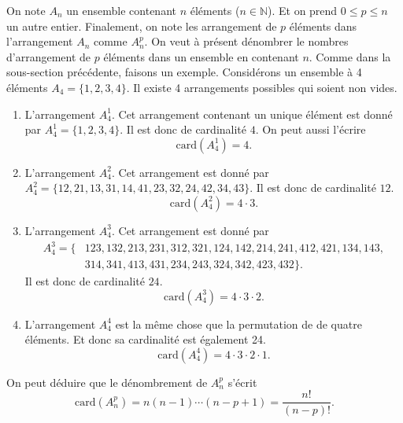 \documentclass[a4paper,12pt]{book}
\renewcommand{\natural}{\mathbb{N}}
\newcommand{\card}{\mathrm{card}}
\begin{document}
On note $A_n$ un ensemble contenant $n$ éléments ($n\in \natural$). 
Et on prend $0\leq p\leq n$ un autre entier. Finalement, on note 
les arrangement de $p$ éléments dans l'arrangement $A_n$ comme $A^p_n$.
On veut à présent dénombrer le nombres d'arrangement de $p$ éléments dans un ensemble 
en contenant $n$. Comme dans la sous-section précédente, faisons un exemple.
Considérons un ensemble à 4 éléments $A_4=\{1,2,3,4\}$. Il existe
4 arrangements possibles qui soient non vides.
\begin{enumerate}
 \item L'arrangement $A_4^1$. Cet arrangement contenant un unique élément est donné par
 $A_4^1=\{1,2,3,4\}$. Il est donc de cardinalité $4$. On peut aussi l'écrire
 \begin{equation*}
  \card(A_4^1)=4.
 \end{equation*}

 \item L'arrangement $A_4^2$. Cet arrangement est donné par \\
 $A_4^2=\{12, 21, 13, 31, 14, 41, 23, 32, 24, 42, 34, 43\}$. Il est donc de cardinalité $12$.
 \begin{equation*}
  \card(A_4^2)=4\cdot 3.
 \end{equation*}
 \item L'arrangement $A_4^3$. Cet arrangement est donné par
 \begin{align*}
 A_4^3=\{&123, 132, 213, 231, 312, 321, 124, 142, 214, 241, 412, 421, 134, 143,\\
         &314, 341, 413, 431, 234, 243, 324, 342, 423, 432\}. 
 \end{align*}
 Il est donc de cardinalité $24$.
 \begin{equation*}
  \card(A_4^3)=4\cdot 3\cdot 2.
 \end{equation*}
 \item L'arrangement $A_4^4$ est la même chose que la permutation de de quatre éléments. Et donc sa cardinalité est également 24.
 \begin{equation*}
  \card(A_4^4)=4\cdot 3\cdot 2\cdot 1.
 \end{equation*}
\end{enumerate}
On peut déduire que le dénombrement de $A_n^p$ s'écrit
\begin{equation}
 \card(A_n^p)=n(n-1)\cdots (n-p+1)=\frac{n!}{(n-p)!}.
\end{equation}
\end{document}
